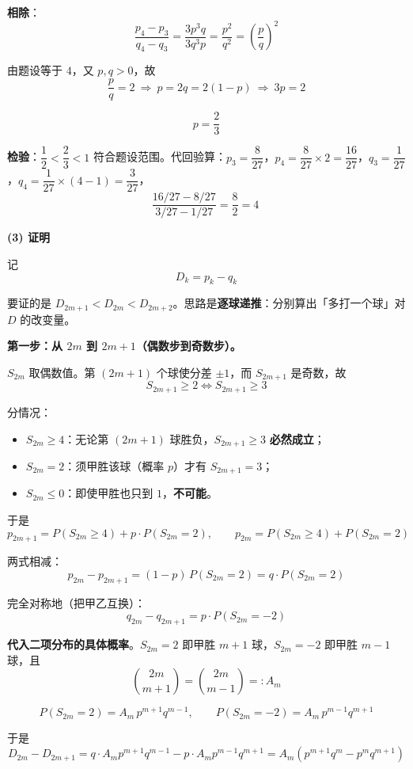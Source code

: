 \textbf{相除}：
\[\frac{p_4-p_3}{q_4-q_3}=\frac{3p^3q}{3q^3p}=\frac{p^2}{q^2}=\left(\frac pq\right)^2\]

由题设等于 $4$，又 $p,q>0$，故
\[\frac pq=2\ \Longrightarrow\ p=2q=2(1-p)\ \Longrightarrow\ 3p=2\]

\[\boxed{p=\frac23}\]

\textbf{检验}：$\dfrac12<\dfrac23<1$  符合题设范围。代回验算：$p_3=\dfrac8{27}$，$p_4=\dfrac8{27}\times2=\dfrac{16}{27}$，$q_3=\dfrac1{27}$，$q_4=\dfrac1{27}\times\left(4-1\right)=\dfrac3{27}$，
\[\frac{16/27-8/27}{3/27-1/27}=\frac{8}{2}=4\ \]

\par\medskip

\textbf{(3) 证明}

记
\[D_k=p_k-q_k\]

要证的是 $D_{2m+1}<D_{2m}<D_{2m+2}$。思路是\textbf{逐球递推}：分别算出「多打一个球」对 $D$ 的改变量。

\par\medskip

\textbf{第一步：从 $2m$ 到 $2m+1$（偶数步到奇数步）。}

$S_{2m}$ 取偶数值。第 $(2m+1)$ 个球使分差 $\pm1$，而 $S_{2m+1}$ 是奇数，故
\[S_{2m+1}\ge2\iff S_{2m+1}\ge3\]

分情况：

\begin{itemize}
\item $S_{2m}\ge4$：无论第 $(2m+1)$ 球胜负，$S_{2m+1}\ge3$ \textbf{必然成立}；
\item $S_{2m}=2$：须甲胜该球（概率 $p$）才有 $S_{2m+1}=3$；
\item $S_{2m}\le0$：即使甲胜也只到 $1$，\textbf{不可能}。
\end{itemize}

于是
\[p_{2m+1}=P\left(S_{2m}\ge4\right)+p\cdot P\left(S_{2m}=2\right),\qquad p_{2m}=P\left(S_{2m}\ge4\right)+P\left(S_{2m}=2\right)\]

两式相减：
\[p_{2m}-p_{2m+1}=(1-p)\,P\left(S_{2m}=2\right)=q\cdot P\left(S_{2m}=2\right)\]

完全对称地（把甲乙互换）：
\[q_{2m}-q_{2m+1}=p\cdot P\left(S_{2m}=-2\right)\]

\textbf{代入二项分布的具体概率}。$S_{2m}=2$ 即甲胜 $m+1$ 球，$S_{2m}=-2$ 即甲胜 $m-1$ 球，且
\[\binom{2m}{m+1}=\binom{2m}{m-1}=:A_m\]

\[P\left(S_{2m}=2\right)=A_m\,p^{m+1}q^{m-1},\qquad P\left(S_{2m}=-2\right)=A_m\,p^{m-1}q^{m+1}\]

于是
\[D_{2m}-D_{2m+1}=q\cdot A_mp^{m+1}q^{m-1}-p\cdot A_mp^{m-1}q^{m+1}=A_m\left(p^{m+1}q^{m}-p^{m}q^{m+1}\right)\]

